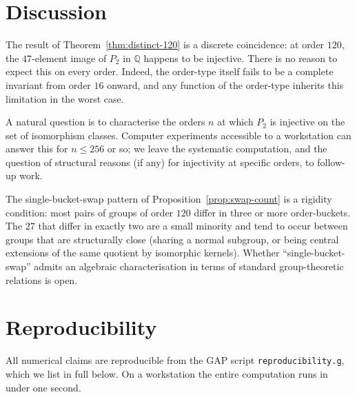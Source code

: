 \documentclass[11pt]{amsart}
\theoremstyle{plain}
\theoremstyle{definition}
\begin{document}
\section{Discussion}

The result of Theorem~\ref{thm:distinct-120} is a discrete coincidence: at order $120$, the $47$-element image of $P_2$ in $\mathbb{Q}$ happens to be injective. There is no reason to expect this on every order. Indeed, the order-type itself fails to be a complete invariant from order $16$ onward, and any function of the order-type inherits this limitation in the worst case.

A natural question is to characterise the orders $n$ at which $P_2$ is injective on the set of isomorphism classes. Computer experiments accessible to a workstation can answer this for $n \leq 256$ or so; we leave the systematic computation, and the question of structural reasons (if any) for injectivity at specific orders, to follow-up work.

The single-bucket-swap pattern of Proposition~\ref{prop:swap-count} is a rigidity condition: most pairs of groups of order $120$ differ in three or more order-buckets. The $27$ that differ in exactly two are a small minority and tend to occur between groups that are structurally close (sharing a normal subgroup, or being central extensions of the same quotient by isomorphic kernels). Whether ``single-bucket-swap'' admits an algebraic characterisation in terms of standard group-theoretic relations is open.

\section{Reproducibility}
\label{sec:reproducibility}

All numerical claims are reproducible from the GAP script \texttt{reproducibility.g}, which we list in full below. On a workstation the entire computation runs in under one second.
\end{document}

